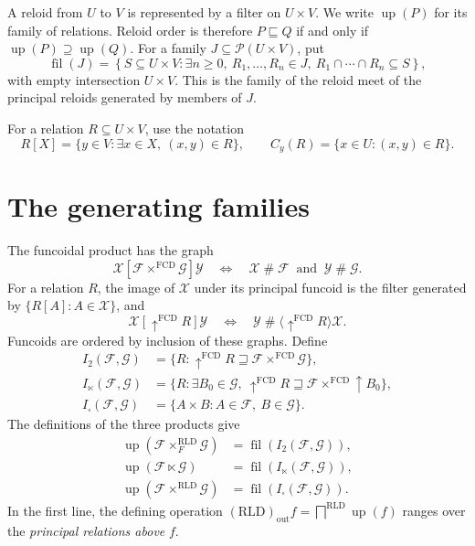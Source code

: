 \documentclass[11pt,a4paper]{amsart}
\theoremstyle{definition}
\theoremstyle{remark}
\newcommand{\RLD}{\mathrm{RLD}}
\newcommand{\FCD}{\mathrm{FCD}}
\newcommand{\out}{\operatorname{out}}
\newcommand{\fil}{\operatorname{fil}}
\newcommand{\Up}{\operatorname{up}}
\newcommand{\cF}{\mathcal{F}}
\newcommand{\cG}{\mathcal{G}}
\newcommand{\cX}{\mathcal{X}}
\newcommand{\cY}{\mathcal{Y}}
\begin{document}
A reloid from $U$ to $V$ is represented by a filter on $U\times V$. We write
$\Up(P)$ for its family of relations. Reloid order is therefore
$P\sqsubseteq Q$ if and only if $\Up(P)\supseteq\Up(Q)$.
For a family $J\subseteq\mathcal P(U\times V)$, put
\begin{equation}\label{eq:generated}
 \fil(J)=\left\{S\subseteq U\times V:
 \exists n\ge0,\ R_1,\ldots,R_n\in J,\
 R_1\cap\cdots\cap R_n\subseteq S\right\},
\end{equation}
with empty intersection $U\times V$. This is the family of the reloid meet
of the principal reloids generated by members of $J$.

For a relation $R\subseteq U\times V$, use the notation
\[
 R[X]=\{y\in V:\exists x\in X,\ (x,y)\in R\},
 \qquad C_y(R)=\{x\in U:(x,y)\in R\}.
\]

\section{The generating families}

The funcoidal product has the graph
\[
 \cX[\cF\times^{\FCD}\cG]\cY
 \quad\Longleftrightarrow\quad
 \cX\mathrel{\#}\cF\ \text{ and }\ \cY\mathrel{\#}\cG.
\]
For a relation $R$, the image of $\cX$ under its principal funcoid is the
filter generated by $\{R[A]:A\in\cX\}$, and
\[
 \cX[\uparrow^{\FCD}R]\cY
 \quad\Longleftrightarrow\quad
 \cY\mathrel{\#}\langle\uparrow^{\FCD}R\rangle\cX.
\]
Funcoids are ordered by inclusion of these graphs. Define
\begin{align*}
 I_2(\cF,\cG)&=\{R:\uparrow^{\FCD}R
                         \sqsupseteq\cF\times^{\FCD}\cG\},\\
 I_{\ltimes}(\cF,\cG)&=\{R:\exists B_0\in\cG,\
            \uparrow^{\FCD}R\sqsupseteq\cF\times^{\FCD}\uparrow B_0\},\\
 I_{\square}(\cF,\cG)&=\{A\times B:A\in\cF,\ B\in\cG\}.
\end{align*}
The definitions of the three products give
\begin{align}\label{eq:products}
 \Up(\cF\times_F^{\RLD}\cG)&=\fil(I_2(\cF,\cG)),\nonumber\\
 \Up(\cF\ltimes\cG)&=\fil(I_{\ltimes}(\cF,\cG)),\\
 \Up(\cF\times^{\RLD}\cG)&=\fil(I_{\square}(\cF,\cG)).\nonumber
\end{align}
In the first line, the defining operation
$(\RLD)_{\out}f=\bigsqcap^{\RLD}\Up(f)$ ranges over the
\emph{principal relations above} $f$.
\end{document}
